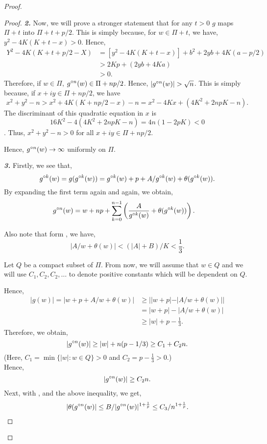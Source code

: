 \begin{proof}
\begin{proof}
	\noindent \textbf{\emph{2.}} Now, we will prove a stronger statement that for any \( t>0 \)
	\( g \) maps \( \Pi+t \) into \( \Pi+t+p /2 \). This is simply because, for \( w\in\Pi+t \),
	we have, \( y^2-4K(K+t-x)>0 \). Hence,
	\begin{align*}
		Y^2-4K(K+t+p /2-X)&=[y^2-4K(K+t-x)]+b^2+2yb+4K(a-p /2)\\
		&> 2Kp+(2yb+4Ka)\\
		&>0
	.\end{align*}
	Therefore, if \( w\in\Pi \), \( \gog[n](w)\in \Pi+np /2 \). Hence, \( |\gog[n](w)|>\sqrt{n}  \).
	This is simply because, if \( x+iy\in \Pi+np /2 \), we have \[ x^2+y^2-n>x^2+4K(K+np /2-x)-n=x^2-4Kx+(4K^2+2npK-n). \] The discriminant of this quadratic equation in \( x \) is \[ 16K^2-4(4K^2+2npK-n)=4n(1-2pK)<0 \]. Thus, \( x^2+y^2-n>0 \) for all \( x+iy\in \Pi+np /2 \).

Hence, \( \gog[n](w)\to \infty \) uniformly on \( \Pi \).\\
\vspace{1pt}

\noindent \textbf{\emph{3.}} Firstly, we see that, \[
	\gog[k](w)=g(\gog[k](w))=\gog[k](w)+p+A /\gog[k](w)+\theta (\gog[k](w))
.\] 
By expanding the first term again and again, we obtain,
\begin{align}
	\gog[n](w)&=w+np+ \sum_{k=0}^{n-1} \left(\frac{A}{\gog[k](w)}  +\theta(\gog[k](w))\right) \label{eqn3.4}
.\end{align}

Also note that form , we have, \[
	|A /w+\theta (w)|<(|A|+B) /K <\frac{1}{3}
.\] 

Let \( Q \) be a compact subset of \( \Pi \). From now, we will assume that \( w\in Q \) and we will use
\( C_1,C_2,C_2,\ldots  \) to denote positive constants which will be dependent on \( Q \).

Hence,
\begin{align*}
|g(w)|=|w+p+A /w+\theta (w)|&\ge ||w+p|-|A /w+\theta (w)| |\\
								&= |w+p|-|A /w+\theta (w)|\\
								&\ge |w|+p-\frac{1}{3}
.\end{align*}
Therefore, we obtain, \[
	|\gog[n](w)|\ge |w|+n(p-1 /3)\ge C_1+C_2n
.\] 
(Here, \( C_1=\min\{|w|:w\in Q\}>0 \) and \( C_2=p-\frac{1}{3}>0 \).)\\
Hence,
\begin{align}
	|\gog[n](w)|\ge C_2 n\label{eqn3.5}.
\end{align}
Next, with , and the above inequality, we get,
\begin{align}
	|\theta (\gog[n](w)|\le B /|\gog[n](w)|^{1+\frac{1}{p}}\le C_3 /n^{1+\frac{1}{p}}\label{eqn3.6}
.\end{align}


\end{proof}
\end{proof}
